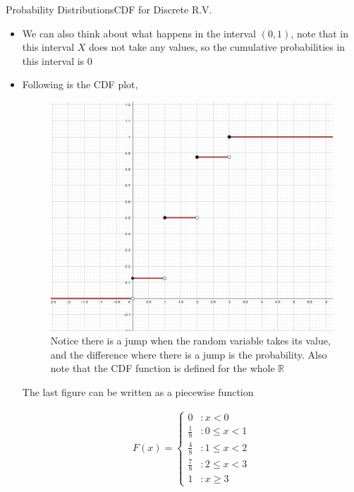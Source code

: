 \documentclass[8pt, usepdftitle=false]{beamer}
\begin{document}
\begin{frame}[allowframebreaks]{Probability Distributions}{CDF for Discrete R.V.}
\begin{itemize}
\begin{align*}
	F(0) &= f(0) = 1/8 \\
	F(1) &=  f(0) + f(1) = 4/8 \\
	F(2) &=  f(0) + f(1) + f(2) = 7/8 \\
	F(3) &=  f(0) + f(1) + f(2) + f(3) = 1
\end{align*}

\item We can also think about what happens in the interval $(0, 1)$, note that in this interval $X$ does not take any values, so the cumulative probabilities in this interval is $0$

\item Following is the CDF plot,


\framebreak

\begin{figure}
\includegraphics[scale = .3]{Images/CDF.png}
\caption{Notice there is a jump when the random variable takes its value, and the difference where there is a jump is the probability. Also note that the CDF function is defined for the whole $\mathbb{R}$}
\end{figure}

\framebreak

The last figure can be written as a piecewise function

\begin{align*}
F(x)= \begin{cases}0 & : x<0 \\ 
\frac{1}{8} & : 0 \leq x<1 \\ 
\frac{4}{8} & : 1 \leq x<2 \\ 
\frac{7}{8} & : 2 \leq x<3 \\ 
1 & : x \geq 3
\end{cases}
\end{align*}


\end{itemize}
\end{frame}
\end{document}
